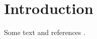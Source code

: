 \documentclass{article}
\begin{document}


\tableofcontents

\section{Introduction}
Some text and references \cite{calkoenTraditionalVsMachineLearning2021}.

\printbibliography
\printglossary
\appendix
\end{document}
